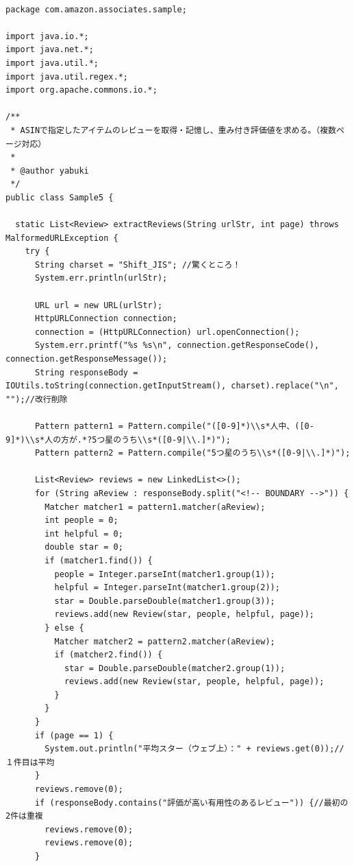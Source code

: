 \begin{lstlisting}

package com.amazon.associates.sample;

import java.io.*;
import java.net.*;
import java.util.*;
import java.util.regex.*;
import org.apache.commons.io.*;

/**
 * ASINで指定したアイテムのレビューを取得・記憶し、重み付き評価値を求める。（複数ページ対応）
 * 
 * @author yabuki
 */
public class Sample5 {

  static List<Review> extractReviews(String urlStr, int page) throws MalformedURLException {
    try {
      String charset = "Shift_JIS"; //驚くところ！
      System.err.println(urlStr);

      URL url = new URL(urlStr);
      HttpURLConnection connection;
      connection = (HttpURLConnection) url.openConnection();
      System.err.printf("%s %s\n", connection.getResponseCode(), connection.getResponseMessage());
      String responseBody = IOUtils.toString(connection.getInputStream(), charset).replace("\n", "");//改行削除

      Pattern pattern1 = Pattern.compile("([0-9]*)\\s*人中、([0-9]*)\\s*人の方が.*?5つ星のうち\\s*([0-9|\\.]*)");
      Pattern pattern2 = Pattern.compile("5つ星のうち\\s*([0-9|\\.]*)");

      List<Review> reviews = new LinkedList<>();
      for (String aReview : responseBody.split("<!-- BOUNDARY -->")) {
        Matcher matcher1 = pattern1.matcher(aReview);
        int people = 0;
        int helpful = 0;
        double star = 0;
        if (matcher1.find()) {
          people = Integer.parseInt(matcher1.group(1));
          helpful = Integer.parseInt(matcher1.group(2));
          star = Double.parseDouble(matcher1.group(3));
          reviews.add(new Review(star, people, helpful, page));
        } else {
          Matcher matcher2 = pattern2.matcher(aReview);
          if (matcher2.find()) {
            star = Double.parseDouble(matcher2.group(1));
            reviews.add(new Review(star, people, helpful, page));
          }
        }
      }
      if (page == 1) {
        System.out.println("平均スター（ウェブ上）：" + reviews.get(0));//１件目は平均
      }
      reviews.remove(0);
      if (responseBody.contains("評価が高い有用性のあるレビュー")) {//最初の2件は重複
        reviews.remove(0);
        reviews.remove(0);
      }


\end{lstlisting}
